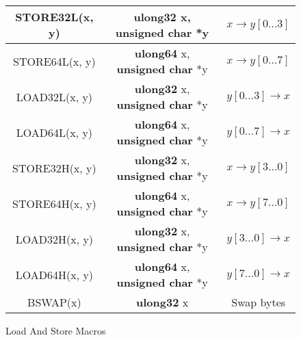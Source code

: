 \documentclass[synpaper]{book}
\begin{document}
        
\newpage
\begin{figure}[hpbt]
\begin{small}
\begin{center}
\begin{tabular}{|c|c|c|}
     \hline STORE32L(x, y) & {\bf ulong32} x, {\bf unsigned char} *y & $x \to y[0 \ldots 3]$ \\
     \hline STORE64L(x, y) & {\bf ulong64} x, {\bf unsigned char} *y & $x \to y[0 \ldots 7]$ \\
     \hline LOAD32L(x, y) & {\bf ulong32} x, {\bf unsigned char} *y & $y[0 \ldots 3] \to x$ \\
     \hline LOAD64L(x, y) & {\bf ulong64} x, {\bf unsigned char} *y & $y[0 \ldots 7] \to x$ \\
     \hline STORE32H(x, y) & {\bf ulong32} x, {\bf unsigned char} *y & $x \to y[3 \ldots 0]$ \\
     \hline STORE64H(x, y) & {\bf ulong64} x, {\bf unsigned char} *y & $x \to y[7 \ldots 0]$ \\
     \hline LOAD32H(x, y) & {\bf ulong32} x, {\bf unsigned char} *y & $y[3 \ldots 0] \to x$ \\
     \hline LOAD64H(x, y) & {\bf ulong64} x, {\bf unsigned char} *y & $y[7 \ldots 0] \to x$ \\
     \hline BSWAP(x) & {\bf ulong32} x & Swap bytes \\
     \hline
\end{tabular}
\caption{Load And Store Macros}
\end{center}
\end{small}
\end{figure}
\end{document}
